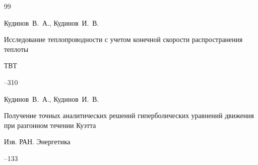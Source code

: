\begin{thebibliography}{99}






\by Кудинов~В.~А., Кудинов~И.~В.

\paper Исследование теплопроводности с учетом конечной скорости распространения теплоты

\jour ТВТ




--310


















\by Кудинов~В.~А., Кудинов~И.~В.

\paper Получение точных аналитических решений гиперболических уравнений движения при разгонном течении Куэтта

\jour  Изв. РАН. Энергетика



--133








\end{thebibliography}
